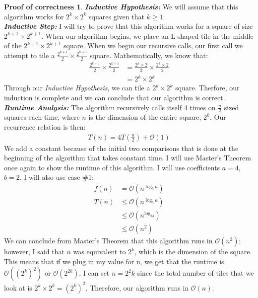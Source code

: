 \documentclass[11pt]{article}
\theoremstyle{definition}
\newtheorem*{proofoc}{Proof of correctness}
\begin{document}
\begin{enumerate}
\begin{proofoc}
    \textbf{\textit{Inductive Hypothesis: }}We will assume that this algorithm works for $2^k \times 2^k$ squares given that $k \geq 1$. \\[0.7em]
    \textbf{\textit{Inductive Step: }}I will try to prove that this algorithm works for a square of size $2^{k+1} \times 2^{k+1}$. When our algorithm begins, we place an L-shaped tile 
    in the middle of the $2^{k+1} \times 2^{k+1}$ square. When we begin our recursive calls, our first call we attempt to tile a $\frac{2^{k+1}}{2} \times \frac{2^{k+1}}{2}$ square.
    Mathematically, we know that:
    \begin{align*}
        \frac{2^{k+1}}{2} \times \frac{2^{k+1}}{2} & = \frac{2^k\times 2}{2} \times \frac{2^k\times 2}{2} \\
        & = 2^k \times 2^k
    \end{align*}
    Through our \textit{Inductive Hypothesis}, we can tile a $2^k \times 2^k$ square. Therfore, our induction is complete and we can conclude that our algorithm is correct. \\[1em]
    \textbf{\textit{Runtime Analysis: }}The algorithm recursively calls itself 4 times on $\frac{n}{2}$ sized squares each time, where $n$ is the dimension of the entire square, $2^k$. Our recurrence relation is then: 
    \begin{align*}
        T(n) = 4T(\frac{n}{2}) + \mathcal{O}(1)
    \end{align*}
    We add a constant because of the initial two comparisons that is done at the beginning of the algorithm that takes constant time. I will use Master's Theorem once again to show the runtime of 
    this algorithm. I will use coefficients $a=4$, $b=2$. I will also use case \#1:  
    \begin{align*}
        f(n) &= \mathcal{O}(n^{\log_ba}) \\
        T(n) & \leq \mathcal{O}(n^{\log_ba}) \\
        & \leq \mathcal{O}(n^{\log_24}) \\
        & \leq \mathcal{O}(n^2)
    \end{align*}
    We can conclude from Master's Theorem that this algorithm runs in $\mathcal{O}(n^2)$; however, I said that $n$ was equivalent to $2^k$, which is the dimension of the square. 
    This means that if we plug in my value for n, we get that the runtime is $\mathcal{O}((2^k)^2)$ or $\mathcal{O}(2^{2k})$. I can set $n = 2^2k$ since the total number of 
    tiles that we look at is $2^k \times 2^k = (2^k)^2$. Therefore, our algorithm runs in $\mathcal{O}(n)$. 
\end{proofoc}
\newpage
\end{enumerate}
\end{document}

